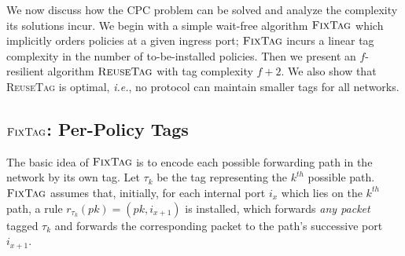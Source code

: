 \documentclass[11pt,pdftex,letter]{article}
\newcommand{\CPO}{\textsc{FixTag}}
\newcommand{\DPO}{\textsc{ReuseTag}}
\newcommand{\ie}{{\it i.e.}}
\newcommand{\mcnote}[1]{\textcolor{heraldBlue}{\small \bf [MC: #1]}}
\newcommand{\mcnote}[1]{}
\begin{document}
We now discuss how the CPC problem can be solved and analyze the
complexity its solutions incur. We begin with a simple wait-free
algorithm $\CPO$ which implicitly orders policies at a given ingress port;
$\CPO$ incurs a linear tag complexity in the number of to-be-installed policies.
Then we present an $f$-resilient algorithm $\DPO$ with
tag complexity $f+2$.
We also show that {\DPO} is optimal, \ie, no
protocol can maintain smaller tags for all networks.

\subsection{$\CPO$: Per-Policy Tags}\label{ssec:path-algo}

The basic idea of $\CPO$ is to encode each possible forwarding path in
the network by its own tag.
Let $\tau_k$ be the tag representing the $k^{\mathit{th}}$ possible path.
$\CPO$  assumes that, initially, for each internal port $i_x$
which lies on the $k^{\mathit{th}}$ path, a rule $r_{\tau_k}(pk)=(pk,
i_{x+1})$ is installed, which forwards \emph{any packet} tagged
$\tau_k$ and forwards the corresponding packet to the path's
successive port $i_{x+1}$.
\end{document}
